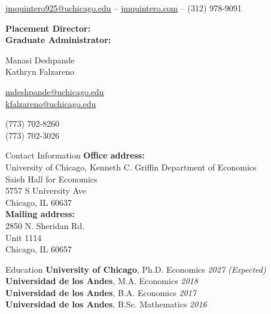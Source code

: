 \documentclass{resume} %
\begin{document}
	\vspace{-8mm}
	\begin{center}
		\href{mailto:jmquintero925@uchicago.edu}{jmquintero925@uchicago.edu} -- \href{https://jmquintero.com}{jmquintero.com} -- (312) 978-9091
	\end{center}
	\vspace{2mm}
	\begin{minipage}[t]{0.32\textwidth}
		\textbf{Placement Director:}\\
		\textbf{Graduate Administrator:}\\
	\end{minipage}
	\begin{minipage}[t]{0.23\textwidth}
		Manasi Deshpande\\
		Kathryn Falzareno\\
	\end{minipage}
	\begin{minipage}[t]{0.29\textwidth}
		\href{mailto:mdeshpande@uchicago.edu}{mdeshpande@uchicago.edu}\\
		\href{mailto:kfalzareno@uchicago.edu}{kfalzareno@uchicago.edu}\\
	\end{minipage}
	\begin{minipage}[t]{0.15\textwidth}
		(773) 702-8260\\
		(773) 702-3026\\
	\end{minipage}

		\begin{rSection}{Contact Information}
			\textbf{Office address:}\\
			University of Chicago, Kenneth C. Griffin Department of Economics\\
			Saieh Hall for Economics\\
			5757 S University Ave\\
			Chicago, IL 60637\\

			\textbf{Mailing address:}\\
			2850 N. Sheridan Rd.\\
			Unit 1114\\
			Chicago, IL 60657
		\end{rSection}

		\begin{rSection}{Education}
			\textbf{University of Chicago}, Ph.D. Economics \hfill {\em 2027 (Expected)}\\
			\textbf{Universidad de los Andes}, M.A. Economics \hfill {\em 2018}\\
			\textbf{Universidad de los Andes}, B.A. Economics \hfill {\em 2017}\\
			\textbf{Universidad de los Andes}, B.Sc. Mathematics \hfill {\em 2016}
	\end{rSection}
\end{document}
